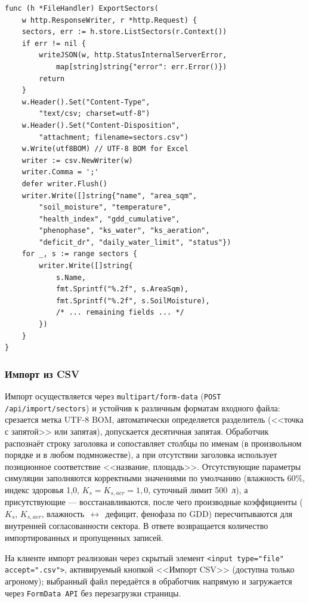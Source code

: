 \begin{lstlisting}[caption={Экспорт секторов в CSV (handler/files.go)}, label={lst:export_csv}]
func (h *FileHandler) ExportSectors(
    w http.ResponseWriter, r *http.Request) {
    sectors, err := h.store.ListSectors(r.Context())
    if err != nil {
        writeJSON(w, http.StatusInternalServerError,
            map[string]string{"error": err.Error()})
        return
    }
    w.Header().Set("Content-Type",
        "text/csv; charset=utf-8")
    w.Header().Set("Content-Disposition",
        "attachment; filename=sectors.csv")
    w.Write(utf8BOM) // UTF-8 BOM for Excel
    writer := csv.NewWriter(w)
    writer.Comma = ';'
    defer writer.Flush()
    writer.Write([]string{"name", "area_sqm",
        "soil_moisture", "temperature",
        "health_index", "gdd_cumulative",
        "phenophase", "ks_water", "ks_aeration",
        "deficit_dr", "daily_water_limit", "status"})
    for _, s := range sectors {
        writer.Write([]string{
            s.Name,
            fmt.Sprintf("%.2f", s.AreaSqm),
            fmt.Sprintf("%.2f", s.SoilMoisture),
            /* ... remaining fields ... */
        })
    }
}
\end{lstlisting}

\subsubsection{Импорт из CSV}

Импорт осуществляется через \texttt{multipart/form-data}
(\texttt{POST /api/import/sectors}) и устойчив к различным
форматам входного файла: срезается метка UTF-8 BOM,
автоматически определяется разделитель (<<точка с запятой>>
или запятая), допускается десятичная запятая. Обработчик
распознаёт строку заголовка и сопоставляет столбцы по именам
(в произвольном порядке и в любом подмножестве), а при
отсутствии заголовка использует позиционное соответствие
<<название, площадь>>. Отсутствующие параметры симуляции
заполняются корректными значениями по умолчанию (влажность
60\%, индекс здоровья 1{,}0, $K_s = K_{s,aer} = 1{,}0$,
суточный лимит 500~л), а присутствующие --- восстанавливаются,
после чего производные коэффициенты ($K_s$, $K_{s,aer}$,
влажность~$\leftrightarrow$~дефицит, фенофаза по GDD)
пересчитываются для внутренней согласованности сектора.
В ответе возвращается количество импортированных и
пропущенных записей.

На клиенте импорт реализован через скрытый элемент
\texttt{<input type="file" accept=".csv">}, активируемый
кнопкой <<Импорт CSV>> (доступна только агроному); выбранный
файл передаётся в обработчик напрямую и загружается через
\texttt{FormData API} без перезагрузки страницы.

